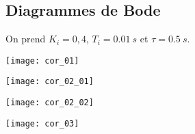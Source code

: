 \begin{multicols}{2}
\ifprof
\begin{corrige}

\end{corrige}
\else
\fi

\subsection*{Diagrammes de Bode}
On prend $K_i=0,4$, $T_i=\SI{0,01}{s}$ et $\tau =\SI{0,5}{s}$.
\\


\end{multicols}
\ifprof

\newpage


\begin{center}
\texttt{[image: cor\_01]}
\end{center}

\begin{center}
\texttt{[image: cor\_02\_01]}
\end{center}


\begin{center}
\texttt{[image: cor\_02\_02]}
\end{center}

\begin{center}
\texttt{[image: cor\_03]}
\end{center}

\else
\fi
